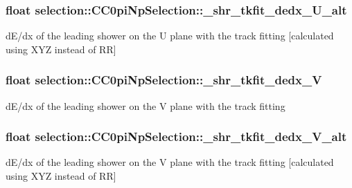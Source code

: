 \subsubsection[{\texorpdfstring{\+\_\+shr\+\_\+tkfit\+\_\+dedx\+\_\+\+U\+\_\+alt}{_shr_tkfit_dedx_U_alt}}]{\setlength{\rightskip}{0pt plus 5cm}float selection\+::\+C\+C0pi\+Np\+Selection\+::\+\_\+shr\+\_\+tkfit\+\_\+dedx\+\_\+\+U\+\_\+alt\hspace{0.3cm}{\ttfamily [private]}}\hypertarget{classselection_1_1CC0piNpSelection_af4cca20b2f900cbff5390127a05b6f9d}{}\label{classselection_1_1CC0piNpSelection_af4cca20b2f900cbff5390127a05b6f9d}
d\+E/dx of the leading shower on the U plane with the track fitting \mbox{[}calculated using X\+YZ instead of RR\mbox{]} 
\subsubsection[{\texorpdfstring{\+\_\+shr\+\_\+tkfit\+\_\+dedx\+\_\+V}{_shr_tkfit_dedx_V}}]{\setlength{\rightskip}{0pt plus 5cm}float selection\+::\+C\+C0pi\+Np\+Selection\+::\+\_\+shr\+\_\+tkfit\+\_\+dedx\+\_\+V\hspace{0.3cm}{\ttfamily [private]}}\hypertarget{classselection_1_1CC0piNpSelection_a428fc549513bea0e1ca92cf90c1148cd}{}\label{classselection_1_1CC0piNpSelection_a428fc549513bea0e1ca92cf90c1148cd}
d\+E/dx of the leading shower on the V plane with the track fitting 
\subsubsection[{\texorpdfstring{\+\_\+shr\+\_\+tkfit\+\_\+dedx\+\_\+\+V\+\_\+alt}{_shr_tkfit_dedx_V_alt}}]{\setlength{\rightskip}{0pt plus 5cm}float selection\+::\+C\+C0pi\+Np\+Selection\+::\+\_\+shr\+\_\+tkfit\+\_\+dedx\+\_\+\+V\+\_\+alt\hspace{0.3cm}{\ttfamily [private]}}\hypertarget{classselection_1_1CC0piNpSelection_aee315f8b5aefc0716f228901b1816939}{}\label{classselection_1_1CC0piNpSelection_aee315f8b5aefc0716f228901b1816939}
d\+E/dx of the leading shower on the V plane with the track fitting \mbox{[}calculated using X\+YZ instead of RR\mbox{]} 
